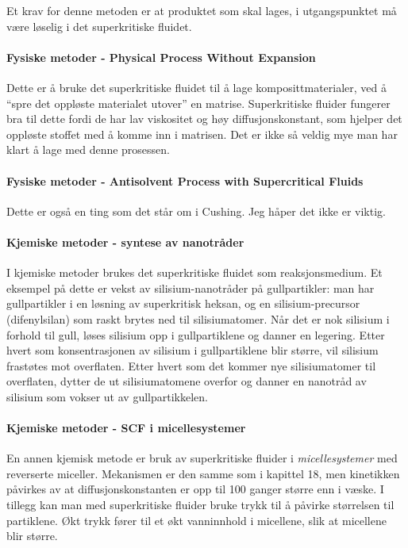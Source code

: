Et krav for denne metoden er at produktet som skal lages, i utgangspunktet må være løselig i det superkritiske fluidet.

\paragraph{Fysiske metoder - Physical Process Without Expansion} Dette er å bruke det superkritiske fluidet til å lage komposittmaterialer, ved å ``spre det oppløste materialet utover'' en matrise. Superkritiske fluider fungerer bra til dette fordi de har lav viskositet og høy diffusjonskonstant, som hjelper det oppløste stoffet med å komme inn i matrisen. Det er ikke så veldig mye man har klart å lage med denne prosessen.

\paragraph{Fysiske metoder - Antisolvent Process with Supercritical Fluids} Dette er også en ting som det står om i Cushing. Jeg håper det ikke er viktig.

\paragraph{Kjemiske metoder - syntese av nanotråder} I kjemiske metoder brukes det superkritiske fluidet som reaksjonsmedium. Et eksempel på dette er vekst av silisium-nanotråder på gullpartikler: man har gullpartikler i en løsning av superkritisk heksan, og en silisium-precursor (difenylsilan) som raskt brytes ned til silisiumatomer. Når det er nok silisium i forhold til gull, løses silisium opp i gullpartiklene og danner en legering. Etter hvert som konsentrasjonen av silisium i gullpartiklene blir større, vil silisium frastøtes mot overflaten. Etter hvert som det kommer nye silisiumatomer til overflaten, dytter de ut silisiumatomene overfor og danner en nanotråd av silisium som vokser ut av gullpartikkelen.

\paragraph{Kjemiske metoder - SCF i micellesystemer} En annen kjemisk metode er bruk av superkritiske fluider i \emph{micellesystemer} med reverserte miceller. Mekanismen er den samme som i kapittel 18, men kinetikken påvirkes av at diffusjonskonstanten er opp til 100 ganger større enn i væske. I tillegg kan man med superkritiske fluider bruke trykk til å påvirke størrelsen til partiklene. Økt trykk fører til et økt vanninnhold i micellene, slik at micellene blir større. %
